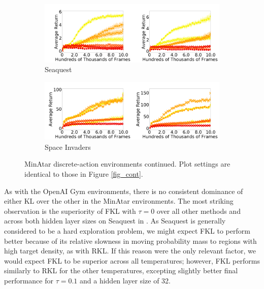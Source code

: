 \documentclass[twoside,11pt]{article}
\begin{document}
\begin{figure}[!htb]
  \begin{subfigure}[b]{1\linewidth}
    \centering
    \includegraphics[width=\columnwidth]{figs/deep/discrete/seaquest_combined.png} 
    \caption{Seaquest
    }\label{fig:seaquest}
  \end{subfigure}%
  
  \begin{subfigure}[b]{1\linewidth}
    \centering
    \includegraphics[width=\columnwidth]{figs/deep/discrete/space_invaders_combined.png} 
    \caption{Space Invaders
    }\label{fig:space-invaders}
  \end{subfigure}
  \caption{MinAtar discrete-action environments continued. Plot settings are identical to those in Figure \ref{fig_cont}. }\label{fig:minatar2}
\end{figure}

As with the OpenAI Gym environments, there is no consistent dominance of either KL over the other in the MinAtar environments. The most striking observation is the superiority of FKL with $\tau = 0$ over all other methods and across both hidden layer sizes on Seaquest in . As Seaquest is generally considered to be a hard exploration problem, we might expect FKL to perform better because of its relative slowness in moving probability mass to regions with high target density, as with RKL. If this reason were the only relevant factor, we would expect FKL to be superior across all temperatures; however, FKL performs similarly to RKL for the other temperatures, excepting slightly better final performance for $\tau = 0.1$ and a hidden layer size of 32. 
\end{document}
